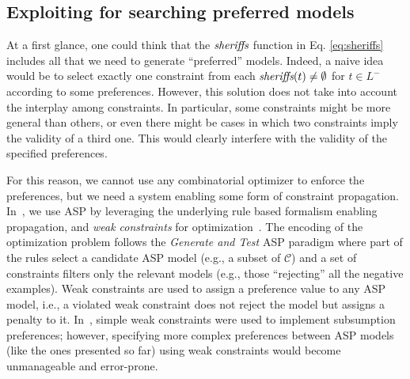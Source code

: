 \subsection{Exploiting \asprin for searching preferred models}
\label{subsec:exploitAsprin}
At a first glance, one could think that the ${\textit{sheriffs}}$ function in Eq. \ref{eq:sheriffs} includes all that we need to generate ``preferred'' models. Indeed, a naive idea would be to select exactly one constraint from each ${\textit{sheriffs}}(t)\neq\emptyset$ for $t\in L^-$ according to some preferences. However, this solution does not take into account the interplay among constraints. In particular, some constraints might be more general than others, or even there might be cases in which two constraints imply the validity of a third one. 
This would clearly interfere with the validity of the specified preferences.  

For this reason, we cannot use any combinatorial optimizer to enforce the preferences, but we need a system enabling some form of constraint propagation. In~\cite{deviant-tkde}, we use \ac{ASP} by leveraging the underlying rule based formalism enabling propagation, and \emph{weak constraints} for optimization~\cite{asp-intro,clingo}. The encoding of the optimization problem follows the \emph{Generate and Test} \ac{ASP} paradigm where part of the rules select a candidate \ac{ASP} model (e.g., a subset of $\mathcal{C}$) and a set of constraints filters only the relevant models (e.g., those ``rejecting'' all the negative examples). Weak constraints are used to assign a preference value to any \ac{ASP} model, i.e., a violated weak constraint does not reject the model but assigns a penalty to it.
%
In~\cite{deviant-tkde}, simple weak constraints were used to implement subsumption preferences; however, specifying more complex preferences between \ac{ASP} models (like the ones presented so far) using weak constraints would become unmanageable and error-prone. 

